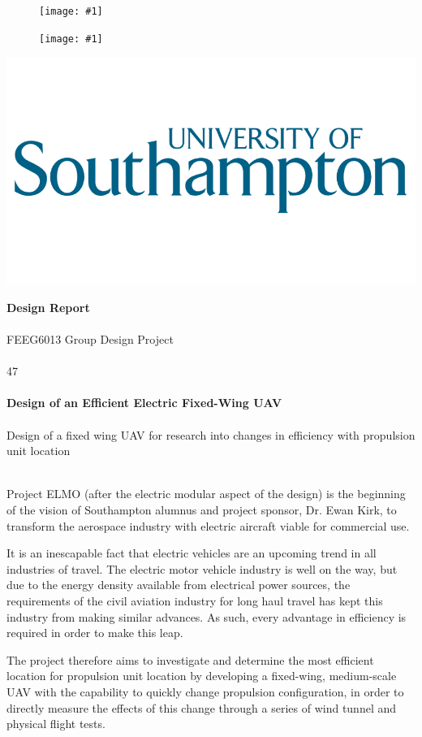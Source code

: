\documentclass[11pt,landscape]{report}
\newcommand{\appendiximage}[2]{
    \begin{figure}[H]
        \begin{center}
        \texttt{[image: \#1]}
        \end{center}
    \end{figure}
}
\begin{document}
\begin{multicols*}{2}

    \appendiximage{elmo-logo}{0.75}
    \vspace{80px}
    \appendiximage{cover-image}{0.95}

\columnbreak
\columnbreak

\begin{titlepage}
    \begin{flushright}
    \includegraphics[width=0.3\columnwidth]{soton-logo}
    \end{flushright}
    \large{\textbf{Design Report}} \tiny{\\}\tiny{\\}
    \large{FEEG6013 Group Design Project} \\
    \vspace{1cm} \\
    \huge{47} \large{\\}\large{\\}
    \LARGE\textbf{Design of an Efficient Electric Fixed-Wing UAV} \large{\\}\large{\\}
    \large{Design of a fixed wing UAV for research into changes in efficiency with propulsion unit location} \large{\\}
    \vspace{1cm} \\
    \small{
        Project ELMO (after the electric modular aspect of the design) is the beginning of the vision of Southampton alumnus and project sponsor, Dr. Ewan Kirk, to transform the aerospace industry with electric aircraft viable for commercial use.
        
        It is an inescapable fact that electric vehicles are an upcoming trend in all industries of travel. 
        The electric motor vehicle industry is well on the way, but due to the energy density available from electrical power sources, the requirements of the civil aviation industry for long haul travel has kept this industry from making similar advances.
        As such, every advantage in efficiency is required in order to make this leap. 

        The project therefore aims to investigate and determine the most efficient location for propulsion unit location by developing a fixed-wing, medium-scale UAV with the capability to quickly change propulsion configuration, in order to directly measure the effects of this change through a series of wind tunnel and physical flight tests. 

}
\end{titlepage}
\end{multicols*}
\end{document}

